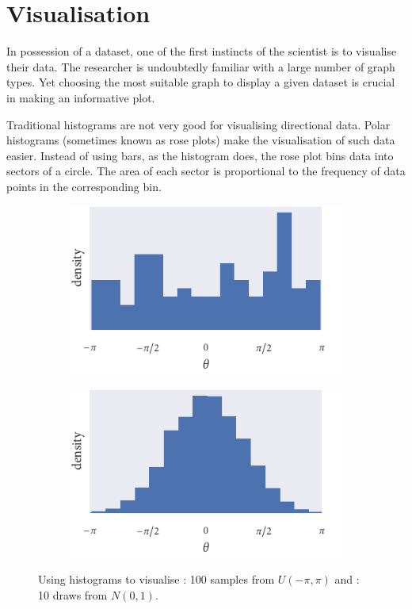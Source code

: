 \section{Visualisation}
\label{sec:circular_visualisation}

In possession of a dataset, one of the first instincts of the scientist is to visualise their data. The researcher is undoubtedly familiar with a large number of graph types. Yet choosing the most suitable graph to display a given dataset is crucial in making an informative plot.

Traditional histograms are not very good for visualising directional data. Polar histograms (sometimes known as rose plots) make the visualisation of such data easier. Instead of using bars, as the histogram does, the rose plot bins data into sectors of a circle. The area of each sector is proportional to the frequency of data points in the corresponding bin.

\begin{figure}
	\begin{subfigure}[b]{0.48\textwidth}
		\includegraphics{unif_angle_hist.pdf}
		\caption{}
		\label{subfig:unif_angle_hist}
	\end{subfigure}%
	\hspace{0.01\textwidth}
	\begin{subfigure}[b]{0.48\textwidth}
		\includegraphics{norm_angle_hist.pdf}
		\caption{}
		\label{subfig:norm_angle_hist}
	\end{subfigure}
	\caption{Using histograms to visualise : 100 samples from $U(-\pi, \pi)$ and : 10 draws from $N(0, 1)$.}
	\label{fig:angle_hist}
\end{figure}

